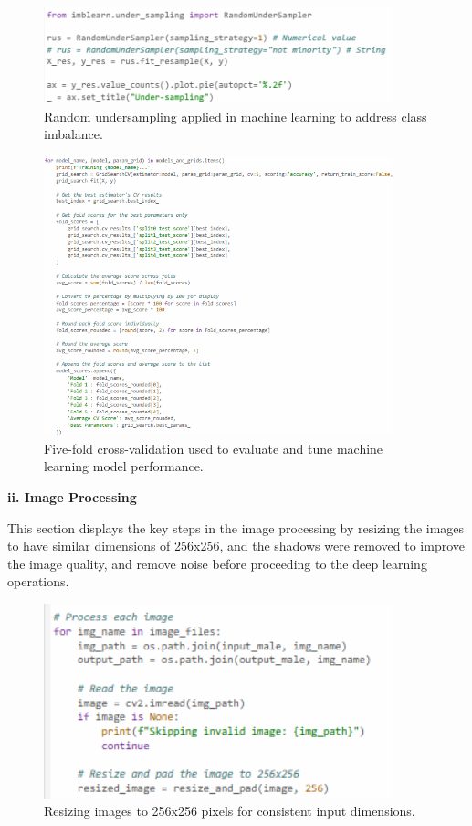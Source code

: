 \begin{figure}[!htbp]
	\centering
	\includegraphics[width=0.9\textwidth, angle=0]{figures/random_undersampling_ML.png}
	\caption{Random undersampling applied in machine learning to address class imbalance.}
\end{figure}

\begin{figure}[!htbp]
	\centering
	\includegraphics[width=0.9\textwidth, angle=0]{figures/ml_five fold_cv.png}
	\caption{Five-fold cross-validation used to evaluate and tune machine learning model performance.}
\end{figure}

\newpage
\noindent\textbf{ii. Image Processing}
\vspace{-0.5cm}

This section displays the key steps in the image processing by resizing the images to have similar dimensions of 256x256, and the shadows were removed to improve the image quality, and remove noise before proceeding to the deep learning operations.
 
\begin{figure}[!htbp]
	\centering
	\includegraphics[width=0.9\textwidth, angle=0]{figures/same_dimensions.png}
	\caption{Resizing images to 256x256 pixels for consistent input dimensions.}
\end{figure}

